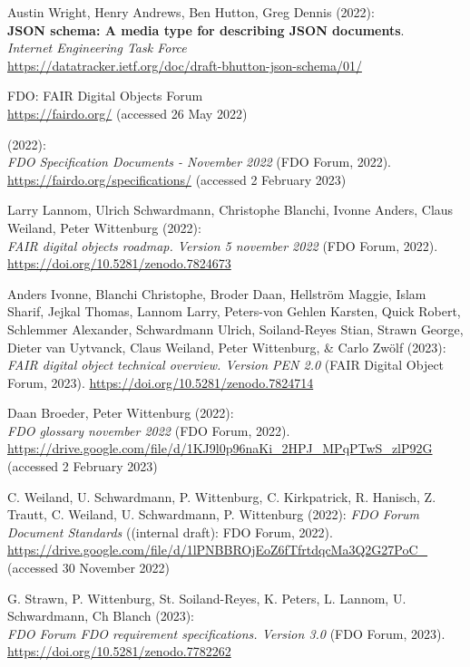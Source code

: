 \begin{thebibliography}{9}
Austin Wright, Henry Andrews, Ben Hutton, Greg Dennis (2022):\\
\textbf{JSON schema: A media type for describing JSON documents}.\\
\emph{Internet Engineering Task Force}\\
\url{https://datatracker.ietf.org/doc/draft-bhutton-json-schema/01/}

FDO: {FAIR Digital Objects Forum} \\
\url{https://fairdo.org/} (accessed 26 May 2022)

(2022): \\
\emph{{FDO Specification Documents - November 2022}} ({FDO
Forum}, 2022). \url{https://fairdo.org/specifications/} (accessed 2
February 2023)

Larry Lannom, Ulrich Schwardmann, Christophe Blanchi, Ivonne Anders,
Claus Weiland, Peter Wittenburg (2022): \\
\emph{FAIR digital objects
roadmap. Version 5 november 2022} ({FDO Forum}, 2022).
\url{https://doi.org/10.5281/zenodo.7824673}

Anders Ivonne, Blanchi Christophe, Broder Daan, Hellström Maggie, Islam
Sharif, Jejkal Thomas, Lannom Larry, Peters-von Gehlen Karsten, Quick
Robert, Schlemmer Alexander, Schwardmann Ulrich, Soiland-Reyes Stian,
Strawn George, Dieter van Uytvanck, Claus Weiland, Peter Wittenburg, \&
Carlo Zwölf (2023): \\
\emph{{FAIR} digital object technical overview.
Version PEN 2.0} ({FAIR Digital Object Forum}, 2023).
\url{https://doi.org/10.5281/zenodo.7824714}

Daan Broeder, Peter Wittenburg (2022): \\
\emph{{FDO} glossary november
2022} ({FDO Forum}, 2022).
\url{https://drive.google.com/file/d/1KJ9l0p96naKi_2HPJ_MPqPTwS_zlP92G}
(accessed 2 February 2023)

C. Weiland, U. Schwardmann, P. Wittenburg, C. Kirkpatrick, R. Hanisch,
Z. Trautt, C. Weiland, U. Schwardmann, P. Wittenburg (2022):
\emph{{FDO Forum Document Standards}} ({(internal draft)}: {FDO Forum},
2022).
\url{https://drive.google.com/file/d/1lPNBBROjEoZ6fTfrtdqcMa3Q2G27PoC_}
(accessed 30 November 2022)

G. Strawn, P. Wittenburg, St. Soiland-Reyes, K. Peters, L. Lannom, U.
Schwardmann, Ch Blanch (2023): \\
\emph{{FDO Forum FDO} requirement
specifications. Version 3.0} ({FDO Forum}, 2023).
\url{https://doi.org/10.5281/zenodo.7782262}


\end{thebibliography}
